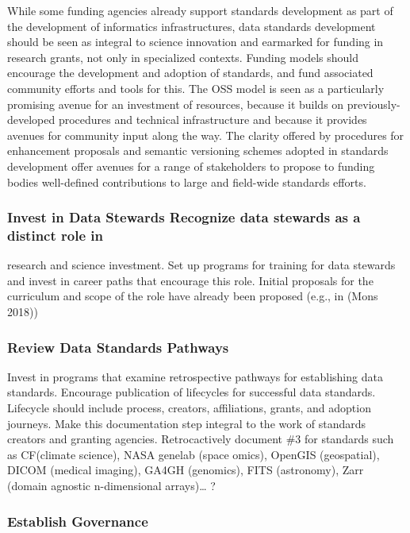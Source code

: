 \documentclass[
  letterpaper,
  DIV=11,
  numbers=noendperiod]{scrartcl}
\begin{document}
While some funding agencies already support standards development as
part of the development of informatics infrastructures, data standards
development should be seen as integral to science innovation and
earmarked for funding in research grants, not only in specialized
contexts. Funding models should encourage the development and adoption
of standards, and fund associated community efforts and tools for this.
The OSS model is seen as a particularly promising avenue for an
investment of resources, because it builds on previously-developed
procedures and technical infrastructure and because it provides avenues
for community input along the way. The clarity offered by procedures for
enhancement proposals and semantic versioning schemes adopted in
standards development offer avenues for a range of stakeholders to
propose to funding bodies well-defined contributions to large and
field-wide standards efforts.

\subsubsection{Invest in Data Stewards Recognize data stewards as a
distinct role
in}\label{invest-in-data-stewards-recognize-data-stewards-as-a-distinct-role-in}

research and science investment. Set up programs for training for data
stewards and invest in career paths that encourage this role. Initial
proposals for the curriculum and scope of the role have already been
proposed (e.g., in (Mons 2018))

\subsubsection{Review Data Standards
Pathways}\label{review-data-standards-pathways}

Invest in programs that examine retrospective pathways for establishing
data standards. Encourage publication of lifecycles for successful data
standards. Lifecycle should include process, creators, affiliations,
grants, and adoption journeys. Make this documentation step integral to
the work of standards creators and granting agencies. Retrocactively
document \#3 for standards such as CF(climate science), NASA genelab
(space omics), OpenGIS (geospatial), DICOM (medical imaging), GA4GH
(genomics), FITS (astronomy), Zarr (domain agnostic n-dimensional
arrays)\ldots{} ?

\subsubsection{Establish Governance}\label{establish-governance}
\end{document}
